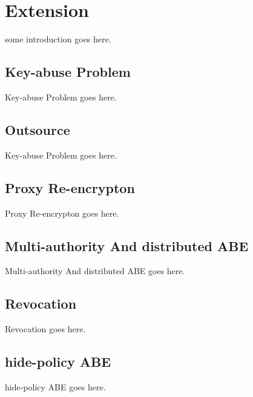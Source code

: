 \section{Extension}
some introduction goes here.

\subsection{Key-abuse  Problem}
Key-abuse  Problem goes here.

\subsection{Outsource}
Key-abuse  Problem goes here.

\subsection{Proxy Re-encrypton}
Proxy Re-encrypton goes here.

\subsection{Multi-authority And distributed ABE}
Multi-authority And distributed ABE goes here.

\subsection{Revocation }
Revocation goes here.

\subsection{hide-policy ABE}
hide-policy ABE goes here.
